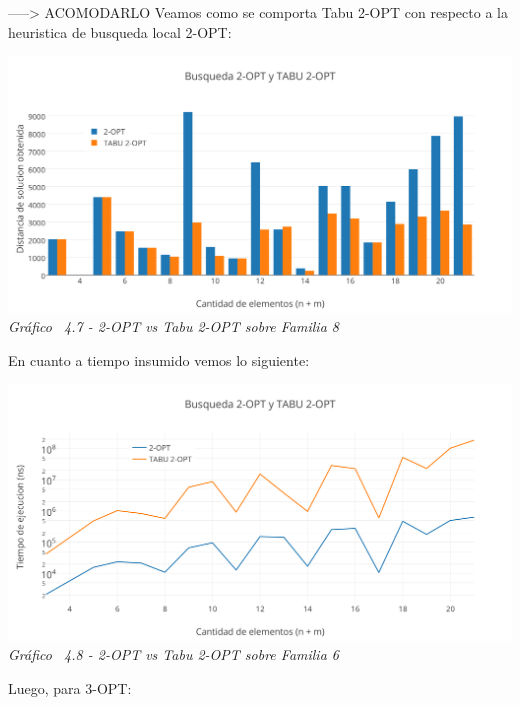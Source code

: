 -----> ACOMODARLO
Veamos como se comporta Tabu 2-OPT con respecto a la heuristica de busqueda local 2-OPT:

\vspace*{0.3cm} \vspace*{0.3cm}
  \begin{center}
 \includegraphics[scale=0.5]{./EJ4/comparativorandom2opt.png}\\
 {            \textit{Gráfico \ 4.7 - 2-OPT vs Tabu 2-OPT sobre Familia 8}}
  \end{center}
  \vspace*{0.3cm}

En cuanto a tiempo insumido vemos lo siguiente:

\vspace*{0.3cm} \vspace*{0.3cm}
  \begin{center}
 \includegraphics[scale=0.5]{./EJ4/medicionrandom2opt.png}\\
 {            \textit{Gráfico \ 4.8 - 2-OPT vs Tabu 2-OPT sobre Familia 6}}
  \end{center}
  \vspace*{0.3cm}


Luego, para 3-OPT:

